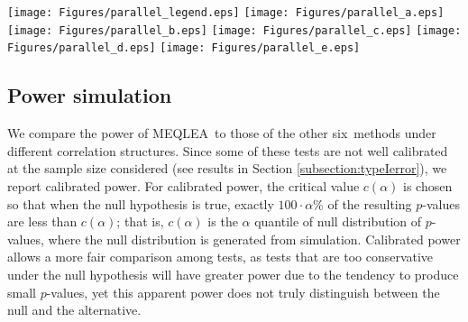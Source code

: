 \documentclass[useAMS,usenatbib, galley]{biom}
\newcommand{\OurMethod}{MEQLEA}
\newcommand{\HowmanyTest}{six}
\newcommand{\aaCase}{a}
\newcommand{\fCase}{e}
\begin{document}
\begin{figure*}[!th]
	\begin{center}
	\texttt{[image: Figures/parallel\_legend.eps]}
	\texttt{[image: Figures/parallel\_a.eps]}
	\texttt{[image: Figures/parallel\_b.eps]}
	\texttt{[image: Figures/parallel\_c.eps]}
	\texttt{[image: Figures/parallel\_d.eps]}
	\texttt{[image: Figures/parallel\_e.eps]}
	\end{center} 
	\caption{Uniform quantile-quantile plots for $p$-values by different methods. Each plot from top to bottom corresponds to correlation structures (\aaCase)-(\fCase), respectively. The left column is for group $A_1$ simulation, and the right column for group $A_2$ simulation (see Table \ref{table:simusetup} for detail). Results are based on 10,000 simulations.}\label{fig:typeIerror}
\end{figure*} 

	
	\subsection{Power simulation}\label{subsection:power}		 


	
	We compare the power of \OurMethod~to those of the other \HowmanyTest~methods under different correlation structures. Since some of these tests are not well calibrated at the sample size considered (see results in Section \ref{subsection:typeIerror}), we report calibrated power. For calibrated power, the critical value $c(\alpha)$ is chosen so that when the null hypothesis is true, exactly $100\cdot\alpha\%$ of the resulting $p$-values are less than $c(\alpha)$; that is, $c(\alpha)$ is  the $\alpha$ quantile of null distribution of $p$-values, where the null distribution is generated from simulation. Calibrated power allows a more fair comparison among tests, as tests that are too conservative under the null hypothesis will have greater power due to the tendency to produce small $p$-values, yet this apparent power does not truly distinguish between the null and the alternative.  
	
\end{document}
